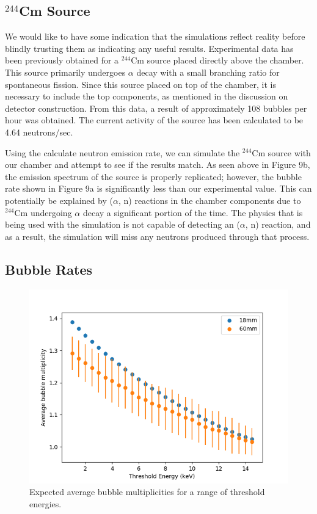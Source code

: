 \documentclass[%
12pt,
twoside,
reprint,
amsmath,amssymb,
aps,
]{article}
\begin{document}
	\subsection{$^{244}$Cm Source}
	\par We would like to have some indication that the simulations reflect reality before blindly trusting them as indicating any useful results. Experimental data has been previously obtained for a $^{244}$Cm source placed directly above the chamber. This source primarily undergoes $\alpha$ decay with a small branching ratio for spontaneous fission. Since this source placed on top of the chamber, it is necessary to include the top components, as mentioned in the discussion on detector construction. From this data, a result of approximately 108 bubbles per hour was obtained. The current activity of the source has been calculated to be 4.64 neutrons/sec.
	\par Using the calculate neutron emission rate, we can simulate the $^{244}$Cm source with our chamber and attempt to see if the results match. As seen above in Figure 9b, the emission spectrum of the source is properly replicated; however, the bubble rate shown in Figure 9a is significantly less than our experimental value. This can potentially be explained by ($\alpha$, n) reactions in the chamber components due to $^{244}$Cm undergoing $\alpha$ decay a significant portion of the time. The physics that is being used with the simulation is not capable of detecting an ($\alpha$, n) reaction, and as a result, the simulation will miss any neutrons produced through that process.
	
	\subsection{Bubble Rates}
	\begin{figure}[!b]
		\includegraphics[scale = 0.8, center]{Images/bubble_mult_no_caps.png}
		\caption{\label{tab:table-name} Expected average bubble multiplicities for a range of threshold energies.}
	\end{figure}
\end{document}
